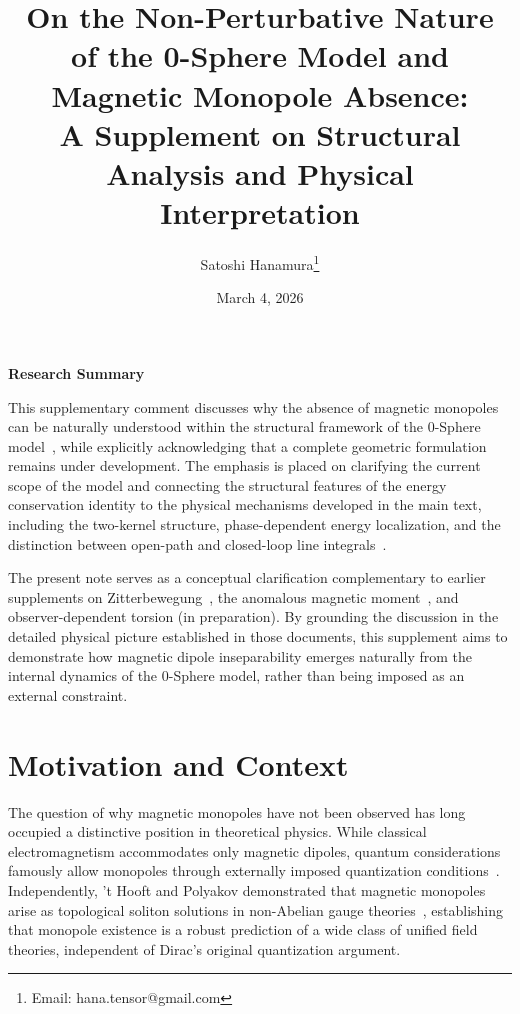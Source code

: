 \documentclass[12pt,letterpaper]{article}
\begin{document}
\title{On the Non-Perturbative Nature \\of the 0-Sphere Model and Magnetic Monopole Absence:\\
\normalsize A Supplement on Structural Analysis and Physical Interpretation}

\author{Satoshi Hanamura\thanks{Email: hana.tensor@gmail.com}}
\date{March 4, 2026}

\maketitle

\tableofcontents


\begin{center}
\textbf{Research Summary}
\end{center}

\justifying
This supplementary comment discusses why the absence of magnetic monopoles can be naturally understood within the structural framework of the 0-Sphere model~\cite{hanamura16759284,hanamura18603340}, while explicitly acknowledging that a complete geometric formulation remains under development. The emphasis is placed on clarifying the current scope of the model and connecting the structural features of the energy conservation identity to the physical mechanisms developed in the main text, including the two-kernel structure, phase-dependent energy localization, and the distinction between open-path and closed-loop line integrals~\cite{hanamura18203433}.

The present note serves as a conceptual clarification complementary to earlier supplements on Zitterbewegung~\cite{hanamura18356895}, the anomalous magnetic moment~\cite{hanamura18511664}, and observer-dependent torsion (in preparation). By grounding the discussion in the detailed physical picture established in those documents, this supplement aims to demonstrate how magnetic dipole inseparability emerges naturally from the internal dynamics of the 0-Sphere model, rather than being imposed as an external constraint.

\clearpage

\section{Motivation and Context}

The question of why magnetic monopoles have not been observed has long occupied a distinctive position in theoretical physics. While classical electromagnetism accommodates only magnetic dipoles, quantum considerations famously allow monopoles through externally imposed quantization conditions~\cite{Dirac1931}. Independently, 't Hooft and Polyakov demonstrated that magnetic monopoles arise as topological soliton solutions in non-Abelian gauge theories~\cite{tHooft1974,Polyakov1974}, establishing that monopole existence is a robust prediction of a wide class of unified field theories, independent of Dirac's original quantization argument.
\end{document}
